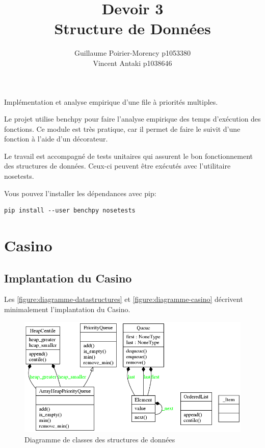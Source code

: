 \documentclass[french]{article}
\title{Devoir 3 \\Structure de Données}
\author{Guillaume Poirier-Morency p1053380 \\ Vincent Antaki p1038646}
\begin{document}
\maketitle

\abstract
Implémentation et analyse empirique d'une file à priorités multiples.

Le projet utilise \textsf{benchpy} pour faire l'analyse empirique des temps
d'exécution des fonctions. Ce module est très pratique, car il permet de faire
le suivit d'une fonction à l'aide d'un décorateur.

Le travail est accompagné de tests unitaires qui assurent le bon fonctionnement
des structures de données. Ceux-ci peuvent être exécutés avec l'utilitaire
\textsf{nosetests}.

Vous pouvez l'installer les dépendances avec \textsf{pip}:
\begin{lstlisting}
pip install --user benchpy nosetests
\end{lstlisting}

\section{Casino}

\subsection{Implantation du Casino}
Les \autoref{figure:diagramme-datastructures} et
\autoref{figure:diagramme-casino} décrivent minimalement l'implantation du
Casino.

\begin{figure}
  \centering
  \caption{Diagramme de classes des structures de données}
  \label{figure:diagramme-datastructures}
  \includegraphics[resolution=130]{figures/diagramme-datastructures.png}
\end{figure}
\end{document}
